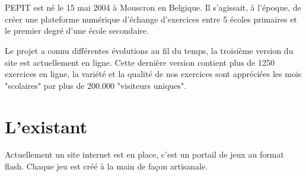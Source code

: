 \section{\pepit}
PEPIT est né le 15 mai 2004 à Mouscron en Belgique. Il s'agissait, à l'époque, de créer une plateforme numérique d'échange d'exercices entre 5 écoles primaires et le premier degré d'une école secondaire.


Le projet a connu différentes évolutions au fil du temps, la troisième version du site est actuellement en ligne. Cette dernière version contient plus de 1250 exercices en ligne, la variété et la qualité de nos exercices sont appréciées les mois "scolaires" par plus de 200.000 "visiteurs uniques".


\section{L'existant}
Actuellement un site internet est en place, c'est un portail de jeux au format flash. Chaque jeu est créé à la main de façon artisanale.

